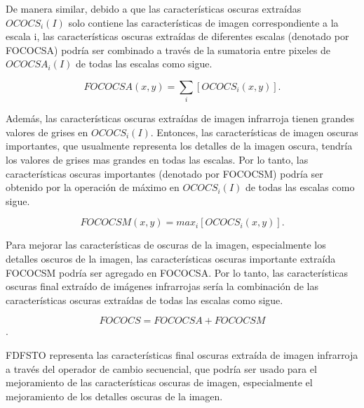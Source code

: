 \documentclass[a4paper, 11 pt, conference]{ieeeconf}      %
\begin{document}
De manera similar, debido a que las caracter\'isticas oscuras extra\'idas  $OCOCS_i(I)$ solo contiene las caracter\'isticas de imagen correspondiente a la escala i, las caracter\'isticas oscuras extra\'idas de diferentes escalas (denotado por FOCOCSA) podr\'ia ser combinado a trav\'es de la sumatoria entre pixeles de $OCOCSA_i(I)$ de todas las escalas como sigue.

$$
FOCOCSA(x,y) = \sum_{i} [OCOCS_i(x,y)].
$$

Adem\'as, las caracter\'isticas oscuras extra\'idas de imagen infrarroja tienen grandes valores de grises en $OCOCS_i(I)$. Entonces, las caracter\'isticas de imagen oscuras importantes, que usualmente representa los detalles de la imagen oscura, tendr\'ia los valores de grises mas grandes en todas las escalas. Por lo tanto, las caracter\'isticas oscuras importantes (denotado por FOCOCSM) podr\'ia ser obtenido por la operaci\'on de m\'aximo en $OCOCS_i(I)$ de todas las escalas como sigue.

$$
FOCOCSM(x,y) = max_i[OCOCS_i(x,y)].
$$

Para mejorar las caracter\'isticas de oscuras de la imagen, especialmente los detalles oscuros de la imagen, las caracter\'isticas oscuras importante extra\'ida FOCOCSM podr\'ia ser agregado en FOCOCSA. Por lo tanto, las caracter\'isticas oscuras final extra\'ido de im\'agenes infrarrojas ser\'ia la combinaci\'on de las caracter\'isticas oscuras extra\'idas de todas las escalas como sigue.

$$FOCOCS = FOCOCSA + FOCOCSM$$.

FDFSTO representa las caracter\'isticas final oscuras extra\'ida de imagen infrarroja a trav\'es del operador de cambio secuencial, que podr\'ia ser usado para el mejoramiento de las caracter\'isticas oscuras de imagen, especialmente el mejoramiento de los detalles oscuras de la imagen.

\end{document}
